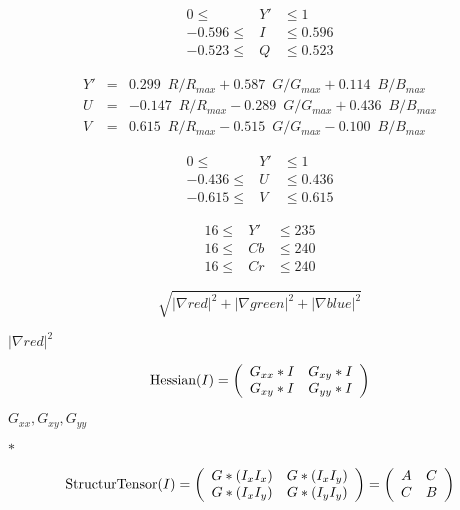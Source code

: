 \documentclass{article}
\begin{document}
\[ \begin{array}{rcl} 0 \leq & Y' & \leq 1 \\ -0.596 \leq & I & \leq 0.596 \\ -0.523 \leq & Q & \leq 0.523 \end{array} \]
\pagebreak

\[ \begin{array}{rcl} Y' & = & 0.299\enspace R / R_{max} + 0.587\enspace G / G_{max} + 0.114\enspace B / B_{max}\\ U & = & -0.147\enspace R / R_{max} - 0.289\enspace G / G_{max} + 0.436\enspace B / B_{max} \\ V & = & 0.615\enspace R / R_{max} - 0.515\enspace G / G_{max} - 0.100\enspace B / B_{max} \end{array} \]
\pagebreak

\[ \begin{array}{rcl} 0 \leq & Y' & \leq 1 \\ -0.436 \leq & U & \leq 0.436 \\ -0.615 \leq & V & \leq 0.615 \end{array} \]
\pagebreak

\[ \begin{array}{rcl} 16\leq & Y' & \leq 235 \\ 16 \leq & Cb & \leq 240 \\ 16 \leq & Cr & \leq 240 \end{array} \]
\pagebreak

\[ \sqrt{|\nabla red|^2 + |\nabla green|^2 + |\nabla blue|^2} \]
\pagebreak

$|\nabla red|^2$
\pagebreak

\[ \mbox{\rm Hessian}(I) = \left( \begin{array}{cc} G_{xx} \ast I & G_{xy} \ast I \\ G_{xy} \ast I & G_{yy} \ast I \end{array} \right) \]
\pagebreak

$G_{xx}, G_{xy}, G_{yy}$
\pagebreak

$\ast$
\pagebreak

\[ \mbox{\rm StructurTensor}(I) = \left( \begin{array}{cc} G \ast (I_x I_x) & G \ast (I_x I_y) \\ G \ast (I_x I_y) & G \ast (I_y I_y) \end{array} \right) = \left( \begin{array}{cc} A & C \\ C & B \end{array} \right) \]
\pagebreak
\end{document}
